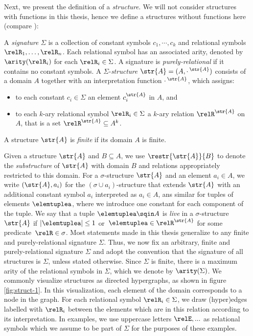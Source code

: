 Next, we present the definition of a \emph{structure}.
We will not consider structures with functions in this thesis, hence we define a structures without functions here (compare \cite[Definition 2.1]{Libkin04}):
\begin{definition}[Structures]
  A \emph{signature} $\Sigma$ is a collection of constant symbols $c_{1}, \cdots, c_{k}$ and relational symbols $\relR_{1}, \ldots, \relR_{n}$.
  Each relational symbol has an associated arity, denoted by $\arity(\relR_{i})$ for each $\relR_{i} \in \Sigma$.
  A signature is \emph{purely-relational} if it contains no constant symbols.
  A $\Sigma$-\emph{structure} $\str{A} = (A, {\cdot\,}^{\str{A}})$ consists of a domain $A$ together with an interpretation function ${\cdot\,}^{\str{A}}$, which assigns:
  \begin{itemize}
    \item to each constant $c_{i} \in \Sigma$ an element $c_{i}^{\str{A}}$ in $A$, and
    \item to each $k$-ary relational symbol $\relR_{i} \in \Sigma$ a $k$-ary relation $\relR^{\str{A}}$ on $A$, that is a set $\relR^{\str{A}} \subseteq A^{k}$.
  \end{itemize}
  A structure $\str{A}$ is \emph{finite} if its domain $A$ is finite.
\end{definition}
Given a structure $\str{A}$ and $B \subseteq A$, we use $\restr{\str{A}}{B}$ to denote the \emph{substructure} of $\str{A}$ with domain $B$ and relations appropriately restricted to this domain.
For a $\sigma$-structure $\str{A}$ and an element $a_{i} \in A$, we write $(\str{A}, a_{i})$ for the $(\sigma \cup {a_{i}})$-structure that extends $\str{A}$ with an additional constant symbol $a_{i}$ interpreted as $a_{i} \in A$, ans similar for tuples of elements $\elemtuplea$, where we introduce one constant for each component of the tuple.
We say that a tuple $\elemtuplea \sqin A$ is \emph{live} in a $\sigma$-structure $\str{A}$ if $|\elemtuplea| \leq 1$ or~$\elemtuplea \in \relR^{\str{A}}$ for some predicate~$\relR \in \sigma$.
Most statements made in this thesis generalize to any finite and purely-relational signature $\Sigma$.
Thus, we now fix an arbitrary, finite and purely-relational signature $\Sigma$ and adopt the convention that the signature of all structures is $\Sigma$, unless stated otherwise.
Since $\Sigma$ is finite, there is a maximum arity of the relational symbols in $\Sigma$, which we denote by $\arity(\Sigma)$.
We commonly visualize structures as directed hypergraphs, as shown in figure \cref{fig:struct-1}.
In this visualization, each element of the domain corresponds to a node in the graph.
For each relational symbol $\relR_{i} \in \Sigma$, we draw (hyper)edges labelled with $\relR_{i}$ between the elements which are in this relation according to its interpretation.
In examples, we use uppercase letters $\relE, ...$ as relational symbols which we assume to be part of $\Sigma$ for the purposes of these examples.

